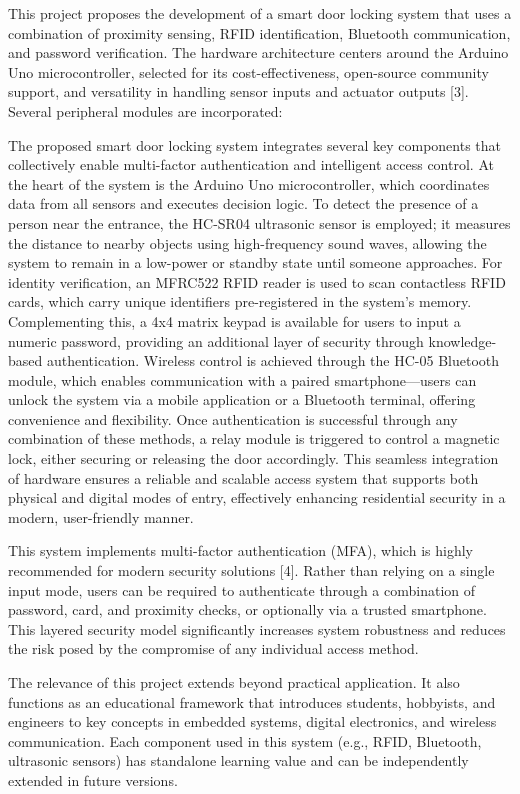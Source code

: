 \documentclass[conference, onecolumn]{IEEEtran}
\begin{document}
This project proposes the development of a smart door locking system that uses a combination of proximity sensing, RFID identification, Bluetooth communication, and password verification. The hardware architecture centers around the Arduino Uno microcontroller, selected for its cost-effectiveness, open-source community support, and versatility in handling sensor inputs and actuator outputs [3]. Several peripheral modules are incorporated:

The proposed smart door locking system integrates several key components that collectively enable multi-factor authentication and intelligent access control. At the heart of the system is the Arduino Uno microcontroller, which coordinates data from all sensors and executes decision logic. To detect the presence of a person near the entrance, the HC-SR04 ultrasonic sensor is employed; it measures the distance to nearby objects using high-frequency sound waves, allowing the system to remain in a low-power or standby state until someone approaches. For identity verification, an MFRC522 RFID reader is used to scan contactless RFID cards, which carry unique identifiers pre-registered in the system's memory. Complementing this, a 4x4 matrix keypad is available for users to input a numeric password, providing an additional layer of security through knowledge-based authentication. Wireless control is achieved through the HC-05 Bluetooth module, which enables communication with a paired smartphone—users can unlock the system via a mobile application or a Bluetooth terminal, offering convenience and flexibility. Once authentication is successful through any combination of these methods, a relay module is triggered to control a magnetic lock, either securing or releasing the door accordingly. This seamless integration of hardware ensures a reliable and scalable access system that supports both physical and digital modes of entry, effectively enhancing residential security in a modern, user-friendly manner.

This system implements multi-factor authentication (MFA), which is highly recommended for modern security solutions [4]. Rather than relying on a single input mode, users can be required to authenticate through a combination of password, card, and proximity checks, or optionally via a trusted smartphone. This layered security model significantly increases system robustness and reduces the risk posed by the compromise of any individual access method.

The relevance of this project extends beyond practical application. It also functions as an educational framework that introduces students, hobbyists, and engineers to key concepts in embedded systems, digital electronics, and wireless communication. Each component used in this system (e.g., RFID, Bluetooth, ultrasonic sensors) has standalone learning value and can be independently extended in future versions.
\end{document}
